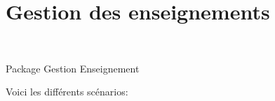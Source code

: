 \section{Gestion des enseignements}

\begin{center}
\\
\par{Package Gestion Enseignement}
\end{center}
Voici les diff{\'e}rents sc{\'e}narios:\\

